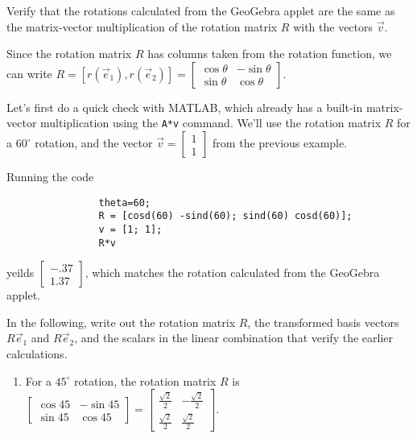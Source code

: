 \documentclass{ximera}
\begin{document}
\begin{exploration}
\begin{remark}
\begin{example}
            Verify that the rotations calculated from the GeoGebra applet are the same as the matrix-vector multiplication of the rotation matrix $R$ with the vectors $\vec{v}$.

            Since the rotation matrix $R$ has columns taken from the rotation function, we can write $R=\left[r(\vec{e}_1), r(\vec{e}_2)\right]=\begin{bmatrix} \cos\theta & -\sin\theta \\ \sin\theta & \cos\theta \end{bmatrix}$.

            Let's first do a quick check with MATLAB, which already has a built-in matrix-vector multiplication using the \texttt{A*v} command. We'll use the rotation matrix $R$ for a $60^\circ$ rotation, and the vector $\vec{v}=\begin{bmatrix} 1 \\ 1 \end{bmatrix}$ from the previous example. 

            Running the code

            \begin{verbatim}
                theta=60;
                R = [cosd(60) -sind(60); sind(60) cosd(60)];
                v = [1; 1];
                R*v
            \end{verbatim}

            yeilds $\begin{bmatrix} -.37 \\ 1.37 \end{bmatrix}$, which matches the rotation calculated from the GeoGebra applet.

            In the following, write out the rotation matrix $R$, the transformed basis vectors $R\vec{e}_1$ and $R\vec{e}_2$, and the scalars in the linear combination that verify the earlier calculations.

            \begin{enumerate}

                \item For a $45^\circ$ rotation, the rotation matrix $R$ is $\begin{bmatrix} \cos 45 & -\sin 45 \\ \sin 45 & \cos 45 \end{bmatrix} = \begin{bmatrix} \frac{\sqrt{2}}{2} & -\frac{\sqrt{2}}{2} \\ \frac{\sqrt{2}}{2} & \frac{\sqrt{2}}{2} \end{bmatrix}$.
                

\end{enumerate}
\end{example}
\end{remark}
\end{exploration}
\end{document}
